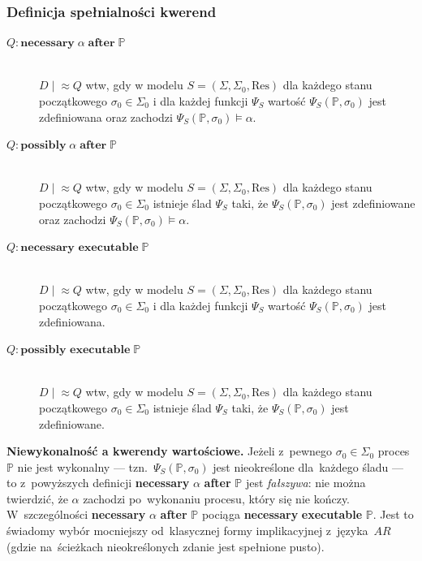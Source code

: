 \documentclass[11pt,a4paper]{article}
\newcommand{\aft}{\textbf{after}}
\newcommand{\necessary}{\textbf{necessary}}
\newcommand{\executable}{\textbf{executable}}
\theoremstyle{definition}
\begin{document}
\subsubsection*{Definicja spełnialności kwerend}
\begin{description}
    \item[$Q: \textbf{necessary}\; \alpha \;\textbf{after}\; \mathbb{P}$] \hfill \\
        $D \mid \! \approx Q$ wtw, gdy w modelu $S = (\Sigma, \Sigma_0, \mathrm{Res})$ dla każdego stanu początkowego $\sigma_0 \in \Sigma_0$ i dla każdej funkcji $\Psi_S$ wartość $\Psi_S(\mathbb{P}, \sigma_0)$ jest zdefiniowana oraz zachodzi $\Psi_S(\mathbb{P}, \sigma_0) \models \alpha$.
    \item[$Q: \textbf{possibly}\; \alpha \;\textbf{after}\; \mathbb{P}$] \hfill \\
        $D \mid \! \approx Q$ wtw, gdy w modelu $S = (\Sigma, \Sigma_0, \mathrm{Res})$ dla każdego stanu początkowego $\sigma_0 \in \Sigma_0$ istnieje ślad $\Psi_S$ taki, że $\Psi_S(\mathbb{P}, \sigma_0)$ jest zdefiniowane oraz zachodzi $\Psi_S(\mathbb{P}, \sigma_0) \models \alpha$.
    \item[$Q: \textbf{necessary executable}\; \mathbb{P}$] \hfill \\
        $D \mid \! \approx Q$ wtw, gdy w modelu $S = (\Sigma, \Sigma_0, \mathrm{Res})$ dla każdego stanu początkowego $\sigma_0 \in \Sigma_0$ i dla każdej funkcji $\Psi_S$ wartość $\Psi_S(\mathbb{P}, \sigma_0)$ jest zdefiniowana.
    \item[$Q: \textbf{possibly executable}\; \mathbb{P}$] \hfill \\
        $D \mid \! \approx Q$ wtw, gdy w modelu $S = (\Sigma, \Sigma_0, \mathrm{Res})$ dla każdego stanu początkowego $\sigma_0 \in \Sigma_0$ istnieje ślad $\Psi_S$ taki, że $\Psi_S(\mathbb{P}, \sigma_0)$ jest zdefiniowane.
\end{description}

\medskip
\noindent\textbf{Niewykonalność a kwerendy wartościowe.}
Jeżeli z~pewnego $\sigma_0 \in \Sigma_0$ proces $\mathbb{P}$ nie jest wykonalny --- tzn.\ $\Psi_S(\mathbb{P},\sigma_0)$ jest nieokreślone dla~każdego śladu --- to z~powyższych definicji \necessary{} $\alpha$ \aft{} $\mathbb{P}$ jest \emph{fałszywa}: nie można twierdzić, że $\alpha$ zachodzi po~wykonaniu procesu, który się nie kończy. W~szczególności \necessary{} $\alpha$ \aft{} $\mathbb{P}$ pociąga \necessary{} \executable{} $\mathbb{P}$. Jest to świadomy wybór mocniejszy od~klasycznej formy implikacyjnej z~języka~$AR$ (gdzie na~ścieżkach nieokreślonych zdanie jest spełnione pusto).
\end{document}
